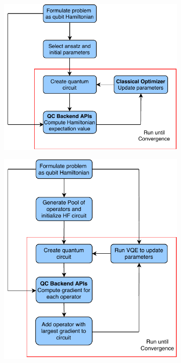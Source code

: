 \documentclass[journal,onecolumn]{IEEEtran}
\begin{document}
\begin{figure}[!htb]
  \centering
  \begin{subfigure}[b]{0.4\textwidth}
    \centering
    \includegraphics[width=0.95\linewidth]{workflow_vqe.pdf}
    \caption{}
    \label{fig:workflow_vqe}
  \end{subfigure}
  \begin{subfigure}[b]{0.4\textwidth}
    \centering
    \includegraphics[width=0.9\linewidth]{workflow_vqe_adapt.pdf}

\end{subfigure}
\end{figure}
\end{document}
